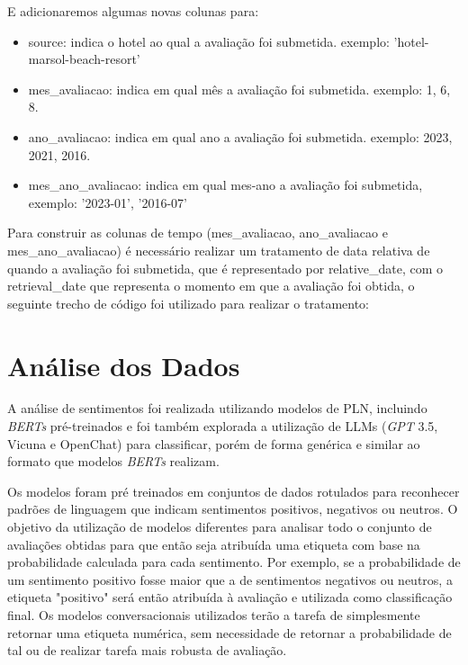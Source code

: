E adicionaremos algumas novas colunas para:

\begin{itemize}
	\item source: indica o hotel ao qual a avaliação foi submetida. exemplo: 'hotel-marsol-beach-resort'
	\item mes\_avaliacao: indica em qual mês a avaliação foi submetida. exemplo: 1, 6, 8.
	\item ano\_avaliacao: indica em qual ano a avaliação foi submetida. exemplo: 2023, 2021, 2016.
	\item mes\_ano\_avaliacao: indica em qual mes-ano a avaliação foi submetida, exemplo: '2023-01', '2016-07'
\end{itemize}

Para construir as colunas de tempo (mes\_avaliacao, ano\_avaliacao e mes\_ano\_avaliacao) é necessário realizar um tratamento de data relativa de quando a avaliação foi submetida, que é representado por relative\_date, com o retrieval\_date que representa o momento em que a avaliação foi obtida, o seguinte trecho de código foi utilizado para realizar o tratamento:



\section{Análise dos Dados}
\label{cap:metodologia:sec:analise_dados}

A análise de sentimentos foi realizada utilizando modelos de PLN, incluindo \textit{BERTs} pré-treinados e foi também explorada a utilização de LLMs (\textit{GPT} 3.5, Vicuna e OpenChat) para classificar, porém de forma genérica e similar ao formato que modelos \textit{BERTs} realizam.

Os modelos foram pré treinados em conjuntos de dados rotulados para reconhecer padrões de linguagem que indicam sentimentos positivos, negativos ou neutros. O objetivo da utilização de modelos diferentes para analisar todo o conjunto de avaliações obtidas para que então seja atribuída uma etiqueta com base na probabilidade calculada para cada sentimento. Por exemplo, se a probabilidade de um sentimento positivo fosse maior que a de sentimentos negativos ou neutros, a etiqueta "positivo" será então atribuída à avaliação e utilizada como classificação final. Os modelos conversacionais utilizados terão a tarefa de simplesmente retornar uma etiqueta numérica, sem necessidade de retornar a probabilidade de tal ou de realizar tarefa mais robusta de avaliação.

